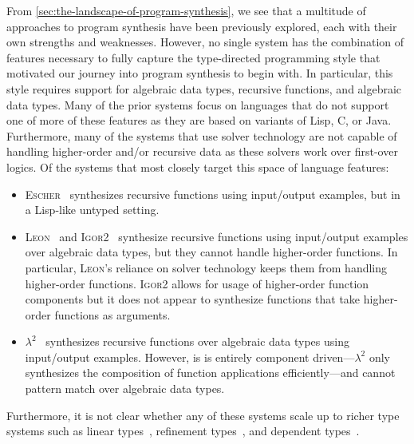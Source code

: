 From \autoref{sec:the-landscape-of-program-synthesis}, we see that a multitude of approaches to program synthesis have been previously explored, each with their own strengths and weaknesses.
However, no single system has the combination of features necessary to fully capture the type-directed programming style that motivated our journey into program synthesis to begin with.
In particular, this style requires support for algebraic data types, recursive functions, and algebraic data types.
Many of the prior systems focus on languages that do not support one of more of these features as they are based on variants of Lisp, C, or Java.
Furthermore, many of the systems that use solver technology are not capable of handling higher-order and/or recursive data as these solvers work over first-over logics.
Of the systems that most closely target this space of language features:
\begin{itemize}
  \item \textsc{Escher}~\citep{albarghouthi-cav-2013} synthesizes recursive functions using input/output examples, but in a Lisp-like untyped setting.
  \item \textsc{Leon}~\citep{kuncak-pldi-2010} and \textsc{Igor2}~\citep{hofmann-aaip-2010} synthesize recursive functions using input/output examples over algebraic data types, but they cannot handle higher-order functions.
    In particular, \textsc{Leon}'s reliance on solver technology keeps them from handling higher-order functions.
    \textsc{Igor2} allows for usage of higher-order function components but it does not appear to synthesize functions that take higher-order functions as arguments.
  \item $λ^2$~\citep{feser-pldi-2015} synthesizes recursive functions over algebraic data types using input/output examples.
    However, is is entirely component driven---$λ^2$ only synthesizes the composition of function applications efficiently---and cannot pattern match over algebraic data types.
\end{itemize}
Furthermore, it is not clear whether any of these systems scale up to richer type systems such as linear types~\citep{girard-1987}, refinement types~\citep{freeman-pldi-1991}, and dependent types~\citep{martin-lof-1984}.


